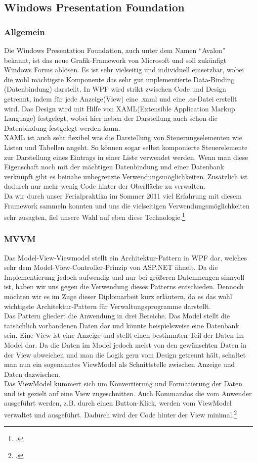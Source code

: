 \subsection{Windows Presentation Foundation}
\subsubsection{Allgemein}
Die Windows Presentation Foundation, auch unter dem Namen “Avalon” bekannt, ist das neue Grafik-Framework von Microsoft und soll zukünfigt Windows Forms ablösen. Es ist sehr vielseitig und individuell einsetzbar, wobei die wohl mächtigste Komponente das sehr gut implementierte Data-Binding (Datenbindung) darstellt. In WPF wird strikt zwischen Code und Design getrennt, indem für jede Anzeige(View) eine .xaml und eine .cs-Datei erstellt wird. 
Das Design wird mit Hilfe von XAML(Extensible Application Markup Language) festgelegt, wobei hier neben der Darstellung auch schon die Datenbindung festgelegt werden kann.\\
XAML ist auch sehr flexibel was die Darstellung von Steuerungselementen wie Listen und Tabellen angeht. So können sogar selbst komponierte Steuerelemente zur Darstellung eines Eintrags in einer Liste verwendet werden. Wenn man diese Eigenschaft noch mit der mächtigen Datenbindung und einer Datenbank verknüpft gibt es beinahe unbegrenzte Verwendungsmöglichkeiten. Zusätzlich ist dadurch nur mehr wenig Code hinter der Oberfläche zu verwalten.\\
Da wir durch unser Ferialpraktika im Sommer 2011 viel Erfahrung mit diesem Framework sammeln konnten und uns die vielseitigen Verwendungsmöglichkeiten sehr zusagten, fiel unsere Wahl auf eben diese Technologie.\footcite[vgl][]{wpf}
\subsubsection{MVVM}
Das Model-View-Viewmodel stellt ein Architektur-Pattern in WPF dar, welches sehr dem Model-View-Controller-Prinzip von ASP.NET ähnelt. Da die Implementierung jedoch aufwendig und nur bei größeren Datenmengen sinnvoll ist, haben wir uns gegen die Verwendung dieses Patterns entschieden. Dennoch möchten wir es im Zuge dieser Diplomarbeit kurz erläutern, da es das wohl wichtigste Architektur-Pattern für Verwaltungsprogramme darstellt.\\
Das Pattern gliedert die Anwendung in drei Bereiche. Das Model stellt die tatsächlich vorhandenen Daten dar und könnte beispielsweise eine Datenbank sein. Eine View ist eine Anzeige und stellt einen bestimmten Teil der Daten im Model dar. Da die Daten im Model jedoch meist von den gewünschten Daten in der View abweichen und man die Logik gern vom Design getrennt hält, schaltet man nun ein sogenanntes ViewModel als Schnittstelle zwischen Anzeige und Daten dazwischen. \\
Das ViewModel kümmert sich um Konvertierung und Formatierung der Daten und ist gezielt auf eine View zugeschnitten. Auch Kommandos die vom Anwender ausgeführt werden, z.B. durch einen Button-Klick, werden vom ViewModel verwaltet und ausgeführt. Dadurch wird der Code hinter der View minimal.\footcite[vgl][]{mvvm}
